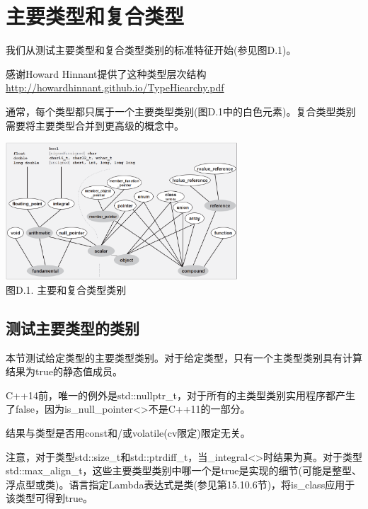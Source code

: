 \section{主要类型和复合类型}

我们从测试主要类型和复合类型类别的标准特征开始(参见图D.1)。

\begin{notice}
感谢Howard Hinnant提供了这种类型层次结构\url{http://howardhinnant.github.io/TypeHiearchy.pdf}
\end{notice}

通常，每个类型都只属于一个主要类型类别(图D.1中的白色元素)。复合类型类别需要将主要类型合并到更高级的概念中。

\begin{center}
\includegraphics[width=0.65\textwidth]{backmatter/Appendix/D/images/1.png} \\
图D.1. 主要和复合类型类别
\end{center}

\subsection{测试主要类型的类别}

本节测试给定类型的主要类型类别。对于给定类型，只有一个主类型类别具有计算结果为true的静态值成员。

\begin{notice}
C++14前，唯一的例外是std::nullptr\_t，对于所有的主类型类别实用程序都产生了false，因为is\_null\_pointer<>不是C++11的一部分。
\end{notice}

结果与类型是否用const和/或volatile(cv限定)限定无关。

注意，对于类型std::size\_t和std::ptrdiff\_t，当\_integral<>时结果为真。对于类型std::max\_align\_t，这些主要类型类别中哪一个是true是实现的细节(可能是整型、浮点型或类)。语言指定Lambda表达式是类(参见第15.10.6节)，将is\_class应用于该类型可得到true。


